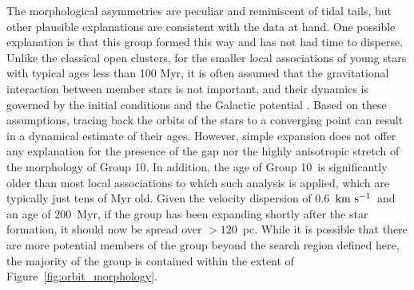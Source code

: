 \documentclass[modern,letterpaper]{aastex61}
\newcommand{\figname}{Figure}
\newcommand{\groupTen}{Group 10}
\newcommand{\kms}{\ensuremath{\rm km~s^{-1}}}
\begin{document}
The morphological asymmetries are peculiar and reminiscent of tidal tails, but other plausible explanations are consistent with the data at hand.
One possible explanation is that this group formed this way and
has not had time to disperse.
Unlike the classical open clusters, for the smaller local associations of young stars
with typical ages less than 100 Myr,
it is often assumed that the gravitational interaction between member stars
is not important, and their dynamics is governed by the initial conditions and
the Galactic potential \citep{1997MNRAS.285..479B,2018arXiv180300573M}.
Based on these assumptions, tracing back the orbits of the stars to a converging point
can result in a dynamical estimate of their ages.
However, simple expansion does not offer any explanation for the presence of the gap nor the highly anisotropic stretch of the morphology of \groupTen.
In addition, the age of \groupTen\ is significantly older than most local associations to
which such analysis is applied, which are typically just tens of Myr old.
Given the velocity dispersion of $0.6$~\kms\ and an age of $200$~Myr,
if the group has been expanding shortly after the star formation,
it should now be spread over $>120$~pc.
While it is possible that there are more potential members of the group
beyond the search region defined here, the majority of the group is contained within
the extent of \figname~\ref{fig:orbit_morphology}.
\end{document}

